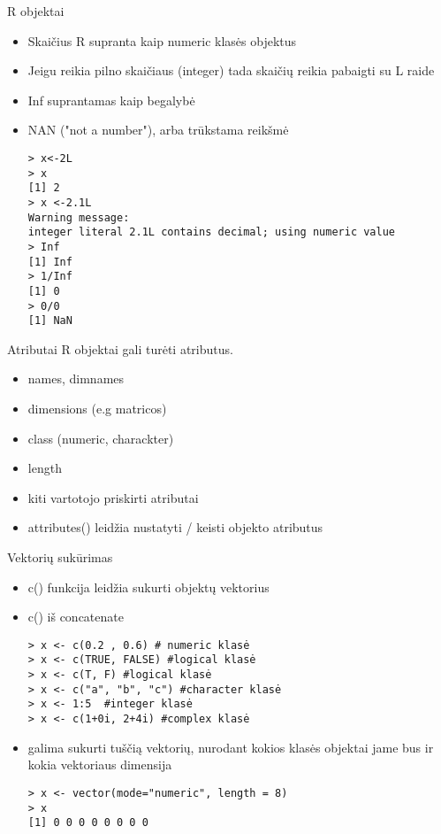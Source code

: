 \documentclass[11pt,xcolor=table]{beamer}
\begin{document}

\begin{frame}[fragile]{R objektai}
\begin{itemize}
\item Skaičius R supranta kaip numeric klasės objektus
\item Jeigu reikia pilno skaičiaus (integer) tada skaičių reikia pabaigti su L raide 
\item Inf suprantamas kaip begalybė
\item NAN ("not a number"), arba  trūkstama reikšmė
\begin{lstlisting}
> x<-2L
> x
[1] 2
> x <-2.1L
Warning message:
integer literal 2.1L contains decimal; using numeric value 
> Inf
[1] Inf
> 1/Inf
[1] 0
> 0/0
[1] NaN
\end{lstlisting}
\end{itemize}
\end{frame}


\begin{frame}[fragile]{Atributai}
R objektai gali turėti atributus.
\begin{itemize}
\item names, dimnames
\item dimensions (e.g matricos)
\item class (numeric, charackter)
\item length
\item kiti vartotojo priskirti atributai
\item attributes() leidžia nustatyti / keisti objekto atributus
\end{itemize}
\end{frame}


\begin{frame}[fragile]{Vektorių sukūrimas}

\begin{itemize}
\item c() funkcija leidžia sukurti objektų vektorius 
\item c() iš concatenate 
\begin{lstlisting}
> x <- c(0.2 , 0.6) # numeric klasė
> x <- c(TRUE, FALSE) #logical klasė
> x <- c(T, F) #logical klasė
> x <- c("a", "b", "c") #character klasė
> x <- 1:5  #integer klasė
> x <- c(1+0i, 2+4i) #complex klasė
\end{lstlisting}
\item galima sukurti tuščią vektorių, nurodant kokios klasės objektai jame bus ir kokia vektoriaus dimensija
\begin{lstlisting}
> x <- vector(mode="numeric", length = 8)
> x
[1] 0 0 0 0 0 0 0 0
\end{lstlisting}
\end{itemize}
\end{frame}
\end{document}
